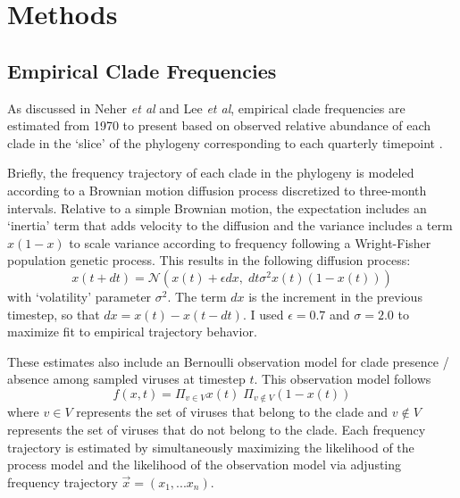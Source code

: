\section{Methods}
\subsection*{Empirical Clade Frequencies}
As discussed in Neher \textit{et al} and Lee \textit{et al}, empirical clade frequencies are estimated from 1970 to present based on observed relative abundance of each clade in the `slice' of the phylogeny corresponding to each quarterly timepoint \citep{lee2018deep,neher2016prediction}.

Briefly, the frequency trajectory of each clade in the phylogeny is modeled according to a Brownian motion diffusion process discretized to three-month intervals.
Relative to a simple Brownian motion, the expectation includes an `inertia' term that adds velocity to the diffusion and the variance includes a term $x(1-x)$ to scale variance according to frequency following a Wright-Fisher population genetic process.
This results in the following diffusion process:
\begin{equation}
  \label{eq_estimate_frequency}
x(t+dt) = \mathcal{N}\left(x(t) + \epsilon dx, \; dt \sigma^2 x(t) (1-x(t))\right)
\end{equation}
\noindent
with `volatility' parameter $\sigma^2$.
The term $dx$ is the increment in the previous timestep, so that $dx = x(t) - x(t-dt)$.
I used $\epsilon = 0.7$ and $\sigma = 2.0$ to maximize fit to empirical trajectory behavior.

These estimates also include an Bernoulli observation model for clade presence / absence among sampled viruses at timestep $t$.
This observation model follows
\begin{equation}
f(x,t) = \Pi_{v \in V} x(t) \; \Pi_{v \notin V} (1-x(t))
\end{equation}
where $v \in V$ represents the set of viruses that belong to the clade and $v \notin V$ represents the set of viruses that do not belong to the clade.
Each frequency trajectory is estimated by simultaneously maximizing the likelihood of the process model and the likelihood of the observation model via adjusting frequency trajectory $\vec{x} = (x_1, ... x_n)$.

